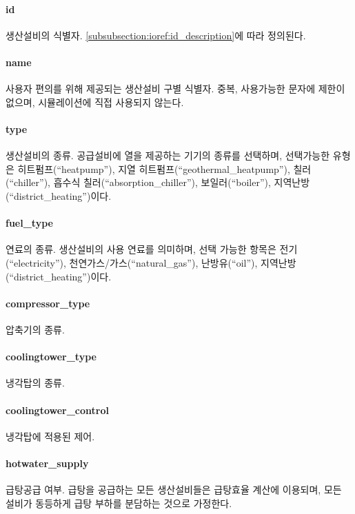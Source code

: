 \paragraph{id} 생산설비의 식별자. \ref{subsubsection:ioref:id_description}에 따라 정의된다.

\paragraph{name} 사용자 편의를 위해 제공되는 생산설비 구별 식별자. 중복, 사용가능한 문자에 제한이 없으며, 시뮬레이션에 직접 사용되지 않는다.

\paragraph{type} 생산설비의 종류. 공급설비에 열을 제공하는 기기의 종류를 선택하며, 선택가능한 유형은 히트펌프(``heatpump''), 지열 히트펌프(``geothermal\_heatpump''), 칠러(``chiller''), 흡수식 칠러(``absorption\_chiller''), 보일러(``boiler''), 지역난방(``district\_heating'')이다.

\paragraph{fuel\_type} 연료의 종류. 생산설비의 사용 연료를 의미하며, 선택 가능한 항목은 전기(``electricity''), 천연가스/가스(``natural\_gas''), 난방유(``oil''), 지역난방(``district\_heating'')이다.

\paragraph{compressor\_type} 압축기의 종류. 

\paragraph{coolingtower\_type} 냉각탑의 종류. 

\paragraph{coolingtower\_control} 냉각탑에 적용된 제어. 

\paragraph{hotwater\_supply} 급탕공급 여부. 급탕을 공급하는 모든 생산설비들은 급탕효율 계산에 이용되며, 모든 설비가 동등하게 급탕 부하를 분담하는 것으로 가정한다.

